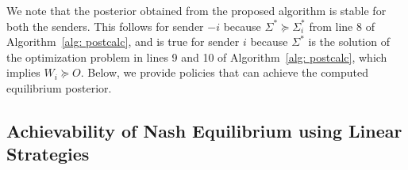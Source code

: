 \documentclass[12pt,journal,onecolumn]{IEEEtran}
\newtheorem{remark}{Remark}
\newtheorem{lemma}{Lemma}
\newenvironment{Proof}[1]{\medskip\par\noindent{\bf Proof:\,}\,#1}{{\mbox{\,$\blacksquare$}\par}}
\begin{document}
We note that the posterior obtained from the proposed algorithm is stable for both the senders. This follows for sender $-i$ because $\Sigma^*\succeq\Sigma_{i}^*$ from line 8 of Algorithm~\ref{alg: postcalc}, and is true for sender $i$ because $\Sigma^*$ is the solution of the optimization problem in lines  9 and 10 of Algorithm~\ref{alg: postcalc}, which implies $W_i\succeq O$. Below, we provide policies that can achieve the computed equilibrium posterior.


\subsection{Achievability of Nash Equilibrium using Linear Strategies}\label{subsect:3_B}
\end{document}
